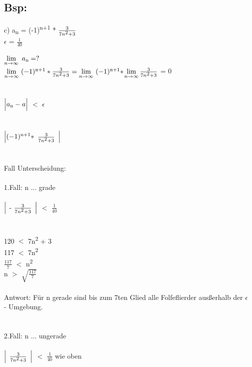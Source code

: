 \documentclass[11pt,a4paper]{article}
\author{Barbara Wiedermann}
\newcommand\tab[1][1cm]{\hspace*{#1}}
\begin{document}
	\subsection{Bsp:}
	c) a\textsubscript{n} = (-1)\textsuperscript{n+1} * $\frac{3}{7n\textsuperscript{2} + 3}$\\
	 \tab $\epsilon$ = $\frac{1}{40}$\\\\
	
	\(\lim\limits_{n \to \infty}\ a\textsubscript{n}=?\)\\
	
	\(\lim\limits_{n \to \infty}\ (-1)\textsuperscript{n+1} * \frac{3}{7n\textsuperscript{2} + 3}= \lim\limits_{n \to \infty}\ (-1)\textsuperscript{n+1} * \)\(\lim\limits_{n \to \infty}\frac{3}{7n\textsuperscript{2} + 3}\) = 0\\\\\\
	$\Bigl| a\textsubscript{n} - a\Bigl| $ $<$ $\epsilon$\\\\\\
	$\Bigl| (-1)\textsuperscript{n+1} *$ $\frac{3}{7n\textsuperscript{2} + 3}$ $\Bigl| $ \\\\\\
	Fall Unterscheidung:\\\\
	1.Fall: n ... grade\\\\
	$\Bigl|$ - $\frac{3}{7n\textsuperscript{2} + 3}$ $\Bigl| $ $<$ $\frac{1}{40}$\\\\\\
	120 $<$ 7n\textsuperscript{2} + 3\\
	117 $<$ 7n\textsuperscript{2}\\
	$\frac{117}{7}$ $<$ n\textsuperscript{2}\\
	n $>$ $\sqrt{\frac{117}{7}}$\\\\
	
	Antwort: Für n gerade sind bis zum 7ten Glied alle Folfeflierder ausßerhalb der $\epsilon$ - Umgebung.\\\\\\
	
	2.Fall: n ... ungerade\\\\
	$\Bigl|$ $\frac{3}{7n\textsuperscript{2} + 3}$ $\Bigl|$ $<$ $\frac{1}{40}$ wie oben
	
	
	
	
	
	
\end{document}
